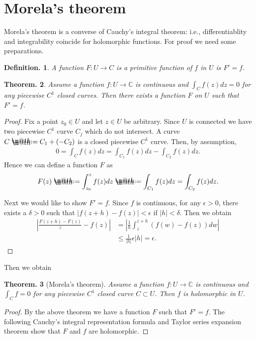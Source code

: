 \documentclass[openany, a4paper, oneside]{jsbook}
\makeatletter
\newcommand*{\defeq}{\mathrel{\rlap{%
\raisebox{0.3ex}{$\m@th\cdot$}}%
\raisebox{-0.3ex}{$\m@th\cdot$}}%
=}
\theoremstyle{break}
\theoremstyle{breakdefn}
\newtheorem{thm}{Theorem.}[section]
\newtheorem{defn}[thm]{Definition.}
\newcommand{\abs}[1]{\left|#1\right|}
\newcommand{\rbk}[1]{\left (#1\right)}
\newcommand{\bbC}{\mathbb{C}}
\makeatother
\begin{document}
\section{Morela's theorem}


Morela's theorem is a converse of Cauchy's integral theorem:
i.e., differentiablity and integrability coincide for holomorphic functions.
For proof we need some preparations.
\begin{defn}
 A function $F \colon U \to C$ is a primitive function of $f$ in $U$ is $F' = f$.
\end{defn}
\begin{thm}
 Assume a function $f \colon U \to \bbC$ is continuous and $\int_C f (z) dz = 0$ for any piecewise $C^1$ closed curves.
 Then there exists a function $F$ on $U$ such that $F' = f$.
\end{thm}
\begin{proof}
Fix a point $z_0 \in U$ and let $z \in U$ be arbitrary.
Since $U$ is connected we have two piecewise $C^1$ curve $C_j$ which do not intersect.
A curve $C \defeq C_1 + (- C_2)$ is a closed piecewise $C^1$ curve.
Then, by assumption,
\begin{align}
 0
 =
 \int_C f (z) dz
 =
 \int_{C_1} f (z) dz - \int_{C_2} f (z) dz.
\end{align}
Hence we can define a function $F$ as
\begin{align}
 F (z)
 \defeq
 \int_{z_0}^{z} f (z) dz
 \defeq
 \int_{C_1} f (z) dz = \int_{C_2} f (z) dz.
\end{align}

Next we would like to show $F' = f$.
Since $f$ is continuous, for any $\epsilon > 0$, there exists a $\delta > 0$ such that $\abs{f (z+h) - f (z)} < \epsilon$ if $\abs{h} < \delta$.
Then we obtain
 \begin{align}
  \abs{\frac{F (z+h) - F (z)}{z} - f (z)}
  &=
  \abs{\frac{1}{h}\int_{z}^{z+h} \rbk{f (w) - f (z)} dw} \\
  &\leq
  \frac{1}{\abs{h}} \epsilon \abs{h} = \epsilon.
  \end{align}
\end{proof}

Then we obtain
\begin{thm}[Morela's theorem]
 Assume a function $f \colon U \to \bbC$ is continuous and $\int_C f = 0$ for any piecewise $C^1$ closed curve $C \subset U$.
 Then $f$ is holomorphic in $U$.
\end{thm}
\begin{proof}
By the above theorem we have a function $F$ such that $F' = f$.
The following Cauchy's integral representation formula and Taylor series expansion theorem show that $F$ and $f$ are holomorphic.
\end{proof}
\end{document}
